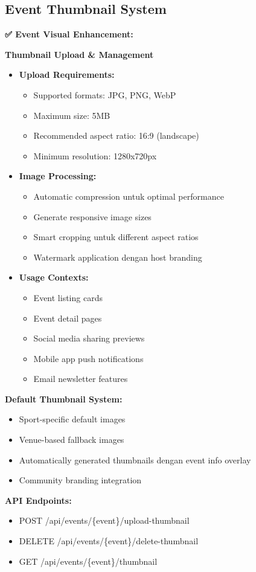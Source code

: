 \documentclass[12pt,a4paper]{article}
\begin{document}
\subsection{Event Thumbnail System}

\begin{implemented}
\textbf{✅ Event Visual Enhancement:}

\textbf{Thumbnail Upload \& Management}
\begin{itemize}
    \item \textbf{Upload Requirements:}
    \begin{itemize}
        \item Supported formats: JPG, PNG, WebP
        \item Maximum size: 5MB
        \item Recommended aspect ratio: 16:9 (landscape)
        \item Minimum resolution: 1280x720px
    \end{itemize}
    \item \textbf{Image Processing:}
    \begin{itemize}
        \item Automatic compression untuk optimal performance
        \item Generate responsive image sizes
        \item Smart cropping untuk different aspect ratios
        \item Watermark application dengan host branding
    \end{itemize}
    \item \textbf{Usage Contexts:}
    \begin{itemize}
        \item Event listing cards
        \item Event detail pages
        \item Social media sharing previews
        \item Mobile app push notifications
        \item Email newsletter features
    \end{itemize}
\end{itemize}

\textbf{Default Thumbnail System:}
\begin{itemize}
    \item Sport-specific default images
    \item Venue-based fallback images
    \item Automatically generated thumbnails dengan event info overlay
    \item Community branding integration
\end{itemize}

\textbf{API Endpoints:}
\begin{itemize}
    \item POST /api/events/\{event\}/upload-thumbnail
    \item DELETE /api/events/\{event\}/delete-thumbnail
    \item GET /api/events/\{event\}/thumbnail
\end{itemize}
\end{implemented}
\end{document}
